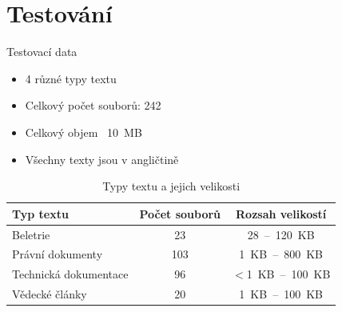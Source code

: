 \documentclass[lualatex,hyperref={pdfencoding=auto}]{beamer}
\begin{document}



\section{Testování}

\begin{frame}{Testovací data}
      \begin{itemize}
        \item 4 různé typy textu
        \item Celkový počet souborů: 242
        \item Celkový objem ~10~MB
        \item Všechny texty jsou v angličtině
      \end{itemize}
      \vspace{12pt}
    \begin{table}[ht]
      \centering
      \begin{tabular}{|l|c|c|}
        \hline
        \textbf{Typ textu} & \textbf{Počet souborů} & \textbf{Rozsah velikostí} \\
        \hline
        Beletrie & 23 & 28~--~120~KB \\
        Právní dokumenty & 103 & 1~KB~--~800~KB \\
        Technická dokumentace & 96 & $<$1~KB~--~100~KB \\
        Vědecké články & 20 & 1~KB~--~100~KB \\
        \hline
      \end{tabular}
      \caption{Typy textu a jejich velikosti}
    \end{table}
\end{frame}
\end{document}
